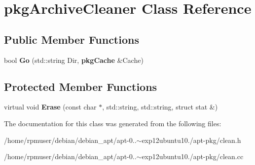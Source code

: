 \section{pkg\-Archive\-Cleaner \-Class \-Reference}
\label{classpkgArchiveCleaner}
\subsection*{\-Public \-Member \-Functions}
\begin{DoxyCompactItemize}
\item 
bool {\bfseries \-Go} (std\-::string \-Dir, {\bf pkg\-Cache} \&\-Cache)\label{classpkgArchiveCleaner_a13c612081a894ad9e735e54f79b961a1}

\end{DoxyCompactItemize}
\subsection*{\-Protected \-Member \-Functions}
\begin{DoxyCompactItemize}
\item 
virtual void {\bfseries \-Erase} (const char $\ast$, std\-::string, std\-::string, struct stat \&)\label{classpkgArchiveCleaner_aa34e9d9eacb3f5c7c0e87d1f73dddf6d}

\end{DoxyCompactItemize}


\-The documentation for this class was generated from the following files\-:\begin{DoxyCompactItemize}
\item 
/home/rpmuser/debian/debian\-\_\-apt/apt-\/0..$\sim$exp12ubuntu10./apt-\/pkg/clean.\-h\item 
/home/rpmuser/debian/debian\-\_\-apt/apt-\/0..$\sim$exp12ubuntu10./apt-\/pkg/clean.\-cc\end{DoxyCompactItemize}
